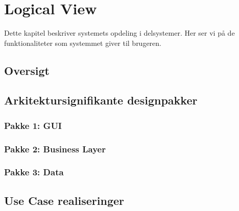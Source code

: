 \section{Logical View}
Dette kapitel beskriver systemets opdeling i delsystemer. Her ser vi på de funktionaliteter som systemmet giver til brugeren. 

\subsection{Oversigt}

\subsection{Arkitektursignifikante designpakker	}
\subsubsection{Pakke 1: GUI}

\subsubsection{Pakke 2: Business Layer}


\subsubsection{Pakke 3: Data}




\subsection{Use Case realiseringer	}
  











